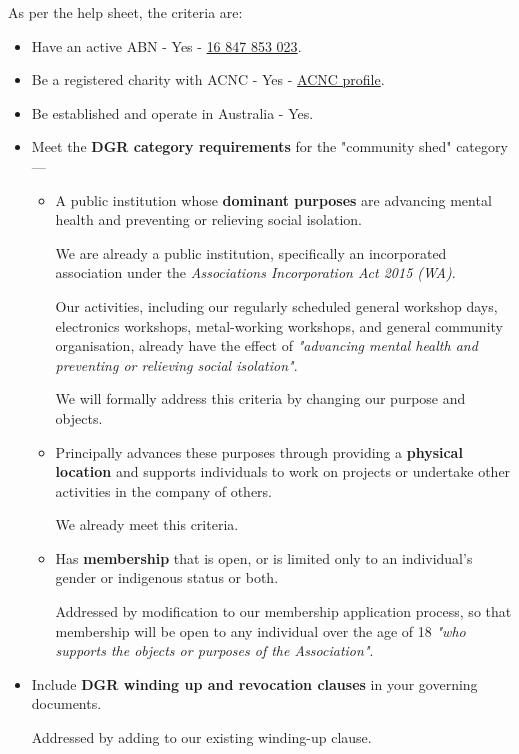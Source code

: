 \documentclass[../constitution.tex]{subfiles}
\begin{document}
\bigskip

As per the help sheet, the criteria are:

\begin{itemize}
    \item Have an active ABN - Yes - \href{https://abr.business.gov.au/ABN/View/16847853023}{16 847 853 023}.
    \item Be a registered charity with ACNC - Yes - \href{https://www.acnc.gov.au/charity/charities/705391a6-3aaf-e811-a963-000d3ad24077/profile}{ACNC profile}.
    \item Be established and operate in Australia - Yes.
    \item Meet the \textbf{DGR category requirements} for the "community shed" category ---
          \begin{itemize}
              \item A public institution whose \textbf{dominant purposes} are advancing mental health and preventing or relieving social isolation.

                    We are already a public institution, specifically an incorporated association under the \textit{Associations Incorporation Act 2015 (WA)}.

                    Our activities, including our regularly scheduled general workshop days, electronics workshops, metal-working workshops, and general community organisation, already have the effect of \textit{"advancing mental health and preventing or relieving social isolation"}.

                    We will formally address this criteria by changing our purpose and objects.
              \item Principally advances these purposes through providing a \textbf{physical location} and supports individuals to work on projects or undertake other activities in the company of others.

                    We already meet this criteria.
              \item Has \textbf{membership} that is open, or is limited only to an individual's gender or indigenous status or both.

                    Addressed by modification to our membership application process, so that membership will be open to any individual over the age of 18 \textit{"who supports the objects or purposes of the Association"}.
          \end{itemize}
    \item Include \textbf{DGR winding up and revocation clauses} in your governing documents.

          Addressed by adding to our existing winding-up clause.
\end{itemize}
\end{document}
